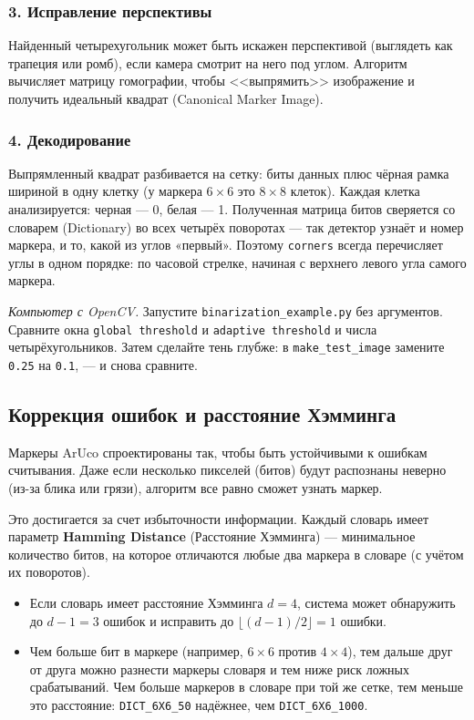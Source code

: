 \subsubsection*{3. Исправление перспективы}
Найденный четырехугольник может быть искажен перспективой (выглядеть как трапеция или ромб), если камера смотрит на него под углом. Алгоритм вычисляет матрицу гомографии, чтобы <<выпрямить>> изображение и получить идеальный квадрат (Canonical Marker Image).

\subsubsection*{4. Декодирование}
Выпрямленный квадрат разбивается на сетку: биты данных плюс чёрная рамка шириной в одну клетку (у маркера $6 \times 6$ это $8 \times 8$ клеток). Каждая клетка анализируется: черная — 0, белая — 1. Полученная матрица битов сверяется со словарем (Dictionary) во всех четырёх поворотах --- так детектор узнаёт и номер маркера, и то, какой из углов «первый». Поэтому \verb|corners| всегда перечисляет углы в одном порядке: по часовой стрелке, начиная с верхнего левого угла самого маркера.

\begin{taskbox}
\emph{Компьютер с OpenCV.} Запустите \verb|binarization_example.py| без аргументов. Сравните окна \texttt{global threshold} и \texttt{adaptive threshold} и числа четырёхугольников. Затем сделайте тень глубже: в \verb|make_test_image| замените \verb|0.25| на \verb|0.1|, --- и снова сравните.
\end{taskbox}

\subsection{Коррекция ошибок и расстояние Хэмминга}
Маркеры ArUco спроектированы так, чтобы быть устойчивыми к ошибкам считывания. Даже если несколько пикселей (битов) будут распознаны неверно (из-за блика или грязи), алгоритм все равно сможет узнать маркер.

Это достигается за счет избыточности информации. Каждый словарь имеет параметр \textbf{Hamming Distance} (Расстояние Хэмминга) — минимальное количество битов, на которое отличаются любые два маркера в словаре (с учётом их поворотов).
\begin{itemize}
    \item Если словарь имеет расстояние Хэмминга $d = 4$, система может обнаружить до $d-1 = 3$ ошибок и исправить до $\lfloor (d-1)/2 \rfloor = 1$ ошибки.
    \item Чем больше бит в маркере (например, $6 \times 6$ против $4 \times 4$), тем дальше друг от друга можно разнести маркеры словаря и тем ниже риск ложных срабатываний. Чем больше маркеров в словаре при той же сетке, тем меньше это расстояние: \verb|DICT_6X6_50| надёжнее, чем \verb|DICT_6X6_1000|.
\end{itemize}

